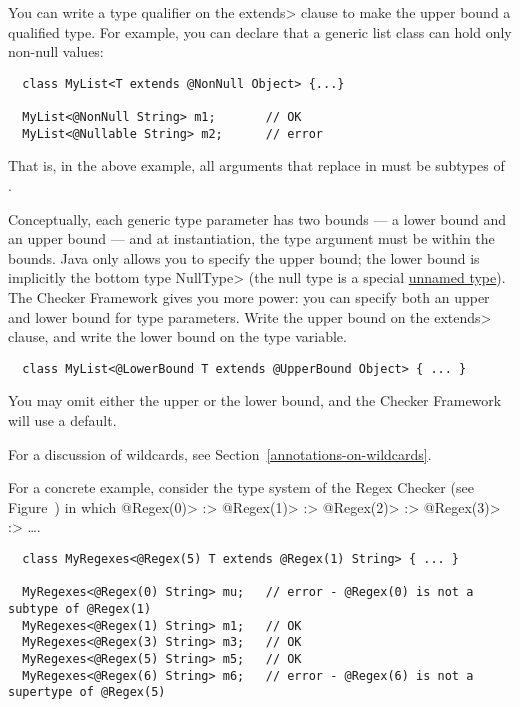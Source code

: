 You can write a type qualifier on the \<extends> clause to make the upper
bound a qualified type.  For example, you can declare that a generic list class can hold only non-null values:

\begin{Verbatim}
  class MyList<T extends @NonNull Object> {...}

  MyList<@NonNull String> m1;       // OK
  MyList<@Nullable String> m2;      // error
\end{Verbatim}

That is, in the above example, all
arguments that replace  in  must be subtypes of
.



Conceptually, each generic type parameter has two bounds --- a lower bound
and an upper bound --- and at instantiation, the type argument must be
within the bounds.  Java only allows you to specify the upper bound; the
lower bound is implicitly the bottom type \<NullType>
(the null type is a special \href{https://docs.oracle.com/javase/specs/jls/se24/html/jls-4.html#jls-4.1}{unnamed type}).
The Checker Framework gives you more power:  you can specify both an upper and lower bound for type parameters.
Write the upper bound on the \<extends> clause, and
write the lower bound on the type variable.

\begin{Verbatim}
  class MyList<@LowerBound T extends @UpperBound Object> { ... }
\end{Verbatim}

You may omit either the upper or the lower bound, and the Checker Framework
will use a default.

For a discussion of wildcards, see Section~\ref{annotations-on-wildcards}.

For a concrete example, consider the type system of the Regex Checker (see
Figure~) in which
 \<@Regex(0)> :>
 \<@Regex(1)> :>
 \<@Regex(2)> :>
 \<@Regex(3)> :> \ldots.

\begin{Verbatim}
  class MyRegexes<@Regex(5) T extends @Regex(1) String> { ... }

  MyRegexes<@Regex(0) String> mu;   // error - @Regex(0) is not a subtype of @Regex(1)
  MyRegexes<@Regex(1) String> m1;   // OK
  MyRegexes<@Regex(3) String> m3;   // OK
  MyRegexes<@Regex(5) String> m5;   // OK
  MyRegexes<@Regex(6) String> m6;   // error - @Regex(6) is not a supertype of @Regex(5)
\end{Verbatim}

